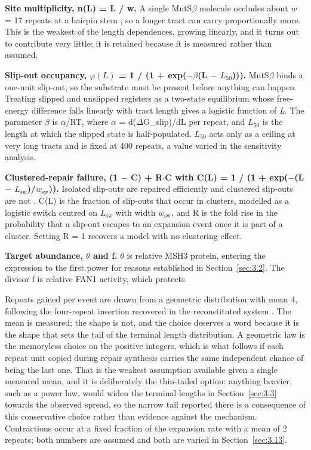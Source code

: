 \documentclass[conference]{IEEEtran}
\begin{document}
\textbf{Site multiplicity, n(L) = L / w.} A single MutS$\beta$ molecule occludes about \textit{w} = 17 repeats at a hairpin stem \cite{tandem}, so a longer tract can carry proportionally more. This is the weakest of the length dependences, growing linearly, and it turns out to contribute very little; it is retained because it is measured rather than assumed.

\textbf{Slip-out occupancy, $\varphi(L)$ = 1 / (1 + exp($-\beta$(L $-$ $L_{50}$))).} MutS$\beta$ binds a one-unit slip-out, so the substrate must be present before anything can happen. Treating slipped and unslipped registers as a two-state equilibrium whose free-energy difference falls linearly with tract length gives a logistic function of \textit{L}. The parameter $\beta$ is $\alpha$/RT, where $\alpha$ = d($\Delta$G\_slip)/dL per repeat, and $L_{50}$ is the length at which the slipped state is half-populated. $L_{50}$ acts only as a ceiling at very long tracts and is fixed at 400 repeats, a value varied in the sensitivity analysis.

\textbf{Clustered-repair failure, (1 $-$ C) + R$\cdot$C with C(L) = 1 / (1 + exp($-$(L $-$ $L_{\mathrm{sw}}$)/$w_{\mathrm{sw}}$)).} Isolated slip-outs are repaired efficiently and clustered slip-outs are not \cite{panigrahi}. C(L) is the fraction of slip-outs that occur in clusters, modelled as a logistic switch centred on $L_{\mathrm{sw}}$ with width $w_{\mathrm{sw}}$, and R is the fold rise in the probability that a slip-out escapes to an expansion event once it is part of a cluster. Setting R = 1 recovers a model with no clustering effect.

\textbf{Target abundance, $\theta$ and f.} $\theta$ is relative MSH3 protein, entering the expression to the first power for reasons established in Section~\ref{sec:3.2}. The divisor f is relative FAN1 activity, which protects.

Repeats gained per event are drawn from a geometric distribution with mean 4, following the four-repeat insertion recovered in the reconstituted system \cite{senoussi}. The mean is measured; the shape is not, and the choice deserves a word because it is the shape that sets the tail of the terminal length distribution. A geometric law is the memoryless choice on the positive integers, which is what follows if each repeat unit copied during repair synthesis carries the same independent chance of being the last one. That is the weakest assumption available given a single measured mean, and it is deliberately the thin-tailed option: anything heavier, such as a power law, would widen the terminal lengths in Section~\ref{sec:3.3} towards the observed spread, so the narrow tail reported there is a consequence of this conservative choice rather than evidence against the mechanism. Contractions occur at a fixed fraction of the expansion rate with a mean of 2 repeats; both numbers are assumed and both are varied in Section~\ref{sec:3.13}.
\end{document}
